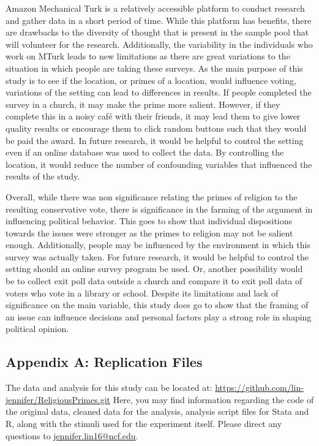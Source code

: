 \documentclass[letterpaper,man,natbib,noextraspace,12pt]{apa6}  %
\begin{document}
Amazon Mechanical Turk is a relatively accessible platform to conduct research and gather data in a short period of time. While this platform has benefits, there are drawbacks to the diversity of thought that is present in the sample pool that will volunteer for the research. Additionally, the variability in the individuals who work on MTurk leads to new limitations as there are great variations to the situation in which people are taking these surveys. As the main purpose of this study is to see if the location, or primes of a location, would influence voting, variations of the setting can lead to differences in results. If people completed the survey in a church, it may make the prime more salient. However, if they complete this in a noisy café with their friends, it may lead them to give lower quality results or encourage them to click random buttons such that they would be paid the award. In future research, it would be helpful to control the setting even if an online database was used to collect the data. By controlling the location, it would reduce the number of confounding variables that influenced the results of the study. 

Overall, while there was non significance relating the primes of religion to the resulting conservative vote, there is significance in the farming of the argument in influencing political behavior. This goes to show that individual dispositions towards the issues were stronger as the primes to religion may not be salient enough. Additionally, people may be influenced by the environment in which this survey was actually taken. For future research, it would be helpful to control the setting should an online survey program be used. Or, another possibility would be to collect exit poll data outside a church and compare it to exit poll data of voters who vote in a library or school. Despite its limitations and lack of significance on the main variable, this study does go to show that the framing of an issue can influence decisions and personal factors play a strong role in shaping political opinion. 



\clearpage

\begin{appendices}
\section{Appendix A: Replication Files}

The data and analysis for this study can be located at: \url{https://github.com/lin-jennifer/ReligiousPrimes.git} Here, you may find information regarding the code of the original data, cleaned data for the analysis, analysis script files for Stata and R, along with the stimuli used for the experiment itself. Please direct any questions to \href{mailto:jennifer.lin16@ncf.edu}{jennifer.lin16@ncf.edu}.

\end{appendices}
\end{document}
